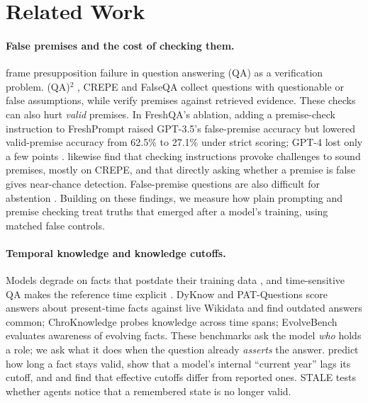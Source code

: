 \section{Related Work}
\label{sec:related}

\paragraph{False premises and the cost of checking them.}
\citet{kim2021linguist} frame presupposition failure in question answering (QA) as a verification problem. (QA)$^2$ \citep{kim2023qa2}, CREPE \citep{yu2023crepe} and FalseQA \citep{hu2023falseqa} collect questions with questionable or false assumptions, while \citet{premiseverif2025} verify premises against retrieved evidence. These checks can also hurt \emph{valid} premises. In FreshQA's ablation, adding a premise-check instruction to FreshPrompt raised GPT-3.5's false-premise accuracy but lowered valid-premise accuracy from 62.5\% to 27.1\% under strict scoring; GPT-4 lost only a few points \citep{vu2024freshllms}. \citet{twoaxes2026} likewise find that checking instructions provoke challenges to sound premises, mostly on CREPE, and that directly asking whether a premise is false gives near-chance detection. False-premise questions are also difficult for abstention \citep{kirichenko2025abstentionbench}. Building on these findings, we measure how plain prompting and premise checking treat truths that emerged after a model's training, using matched false controls.

\paragraph{Temporal knowledge and knowledge cutoffs.}
Models degrade on facts that postdate their training data \citep{lazaridou2021mindgap,dhingra2022timeaware,jang2022temporalwiki,liska2022streamingqa,kasai2023realtimeqa}, and time-sensitive QA makes the reference time explicit \citep{chen2021timeqa,zhang2021situatedqa}. DyKnow \citep{mousavi2024dyknow} and PAT-Questions \citep{meem2024pat} score answers about present-time facts against live Wikidata and find outdated answers common; ChroKnowledge \citep{park2025chroknowledge} probes knowledge across time spans; EvolveBench \citep{evolvebench} evaluates awareness of evolving facts. These benchmarks ask the model \emph{who} holds a role; we ask what it does when the question already \emph{asserts} the answer. \citet{zhang2023discarding} predict how long a fact stays valid, \citet{zhao2024setclock} show that a model's internal ``current year'' lags its cutoff, and \citet{cheng2024dated} and \citet{pezik2025llmlagbench} find that effective cutoffs differ from reported ones. STALE \citep{stale2026} tests whether agents notice that a remembered state is no longer valid.

